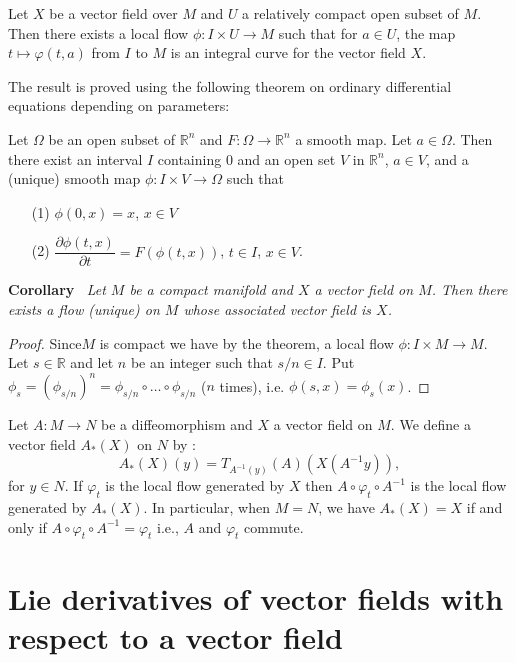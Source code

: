 \begin{theorem}\label{chap6-thm6.2}
Let $X$ be a vector field over $M$ and $U$ a relatively compact open subset of $M$. Then there exists a local flow $\phi:I\times U\to M$ such that for $a\in U$, the map $t\mapsto \varphi(t,a)$ from $I$ to $M$ is an integral curve for the vector field $X$.
\end{theorem}

The result is proved using the following theorem on ordinary differential equations depending on parameters:

Let $\Omega$ be an open subset of $\mathbb{R}^{n}$ and $F:\Omega\to \mathbb{R}^{n}$ a smooth map. Let $a\in \Omega$. Then there exist an interval $I$ containing $0$ and an open set $V$ in $\mathbb{R}^{n}$, $a\in V$, and a (unique) smooth map $\phi:I\times V\to \Omega$ such that
\begin{itemize}
\item[(1)] $\phi(0,x)=x$, $x\in V$

\item[(2)] $\dfrac{\partial \phi(t,x)}{\partial t}=F(\phi(t,x))$, $t\in I$, $x\in V$.
\end{itemize}

\noindent
{\bf Corollary \label{chap6-coro6.2.1}}~{\em Let $M$ be a compact manifold and $X$ a vector field on $M$. Then there exists a flow (unique) on $M$ whose associated vector field is $X$.}

\begin{proof}
Since\pageoriginale $M$ is compact we have by the theorem, a local flow $\phi:I\times M\to M$. Let $s\in \mathbb{R}$ and let $n$ be an integer such that $s/n\in I$. Put $\phi_{s}=(\phi_{s/n})^{n}=\phi_{s/n}\circ\ldots\circ \phi_{s/n}$ ($n$ times), i.e. $\phi(s,x)=\phi_{s}(x)$.
\end{proof}

\begin{remark}\label{chap6-rem6.3}
Let $A:M\to N$ be a diffeomorphism and $X$ a vector field on $M$. We define a vector field $A_{*}(X)$ on $N$ by : 
$$
A_{*}(X)(y)=T_{A^{-1}(y)}(A)(X(A^{-1}y)),
$$
for $y\in N$. If $\varphi_{t}$ is the local flow generated by $X$ then $A\circ \varphi_{t}\circ A^{-1}$ is the local flow generated by $A_{*}(X)$. In particular, when $M=N$, we have $A_{*}(X)=X$ if and only if $A\circ \varphi_{t}\circ A^{-1}=\varphi_{t}$ i.e., $A$ and $\varphi_{t}$ commute. 
\end{remark}

\section*{Lie derivatives of vector fields with respect to a vector field}

